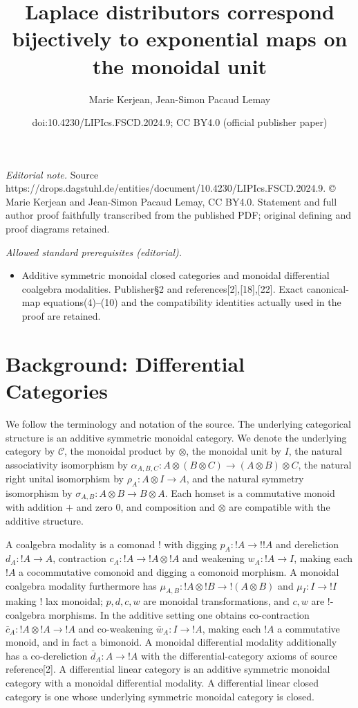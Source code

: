 \documentclass[10pt,a4paper]{amsart}
\title{Laplace distributors correspond bijectively to exponential maps on the monoidal unit}
\author{Marie Kerjean, Jean-Simon Pacaud Lemay}
\date{doi:10.4230/LIPIcs.FSCD.2024.9; CC BY4.0 (official publisher paper)}
\begin{document}
\maketitle
\noindent\textit{Editorial note.} Source https://drops.dagstuhl.de/entities/document/10.4230/LIPIcs.FSCD.2024.9. © Marie Kerjean and Jean-Simon Pacaud Lemay, CC BY4.0. Statement and full author proof faithfully transcribed from the published PDF; original defining and proof diagrams retained.\par\medskip
\noindent\textit{Allowed standard prerequisites (editorial).}\begin{itemize}
\item Additive symmetric monoidal closed categories and monoidal differential coalgebra modalities. Publisher§2 and references[2],[18],[22]. Exact canonical-map equations(4)–(10) and the compatibility identities actually used in the proof are retained.
\end{itemize}\medskip
\section*{Background: Differential Categories}
We follow the terminology and notation of the source.
The underlying categorical structure is an additive symmetric monoidal category.
We denote the underlying category by $\mathcal C$, the monoidal product by $\otimes$,
the monoidal unit by $I$, the natural associativity isomorphism by
$\alpha_{A,B,C}:A\otimes(B\otimes C)\to(A\otimes B)\otimes C$,
the natural right unital isomorphism by $\rho_A:A\otimes I\to A$,
and the natural symmetry isomorphism by $\sigma_{A,B}:A\otimes B\to B\otimes A$.
Each homset is a commutative monoid with addition $+$ and zero $0$, and composition
and $\otimes$ are compatible with the additive structure.

A coalgebra modality is a comonad $!$ with digging $p_A:!A\to!!A$ and
dereliction $d_A:!A\to A$, contraction $c_A:!A\to!A\otimes!A$ and
weakening $w_A:!A\to I$, making each $!A$ a cocommutative comonoid and
digging a comonoid morphism. A monoidal coalgebra modality furthermore has
$\mu_{A,B}:!A\otimes!B\to!(A\otimes B)$ and $\mu_I:I\to!I$ making
$!$ lax monoidal; $p,d,c,w$ are monoidal transformations, and $c,w$ are
$!$-coalgebra morphisms.
In the additive setting one obtains co-contraction
$\bar c_A:!A\otimes!A\to!A$ and co-weakening $\bar w_A:I\to!A$,
making each $!A$ a commutative monoid, and in fact a bimonoid.
A monoidal differential modality additionally has a co-dereliction
$\bar d_A:A\to!A$ with the differential-category axioms of source reference[2].
A differential linear category is an additive symmetric monoidal category with
a monoidal differential modality. A differential linear closed category is one
whose underlying symmetric monoidal category is closed.
\end{document}
